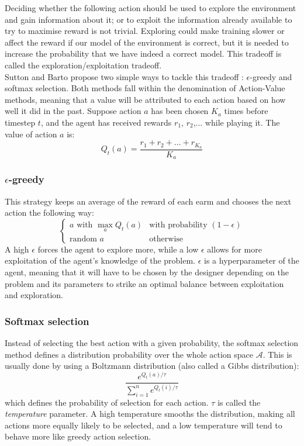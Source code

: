 Deciding whether the following action should be used to explore the environment
and gain information about it; or to exploit the information already available
to try to maximise reward is not trivial. Exploring could make training slower
or affect the reward if our model of the environment is correct, but it is 
needed to increase the probability that we have indeed a correct model. This
tradeoff is called the exploration/exploitation tradeoff. 
\\

Sutton and Barto \cite{suttonbarto} propose two
simple ways to tackle this tradeoff : $\epsilon$-greedy and softmax selection.
Both methods fall within the denomination of Action-Value methods, meaning
that a value will be attributed to each action based on how well it did
in the past. Suppose action $a$ has been chosen $K_a$ times before timestep
$t$, and the agent has received rewards $r_1$, $r_2$,... while playing it. 
The value of action $a$ is:
\begin{equation}
Q_t(a) = \frac{r_1 + r_2 + ... + r_{K_a}}{K_a}
	\label{eq:action-value}
\end{equation}

\subsubsection{$\epsilon$-greedy}
This strategy keeps an average of the reward of each earm and chooses the next
action the following way:
\begin{equation}\begin{cases}
	\text{$a$ with $\max\limits_aQ_t(a)$} & \text{with probability } (1-\epsilon) 
	\\
	\text{random $a$} & \text{otherwise}
\end{cases}
\label{eq:egreedy}
\end{equation}
A high $\epsilon$ forces the agent to explore more, while a low $\epsilon$
allows for more exploitation of the agent's knowledge of the problem. 
$\epsilon$ is a hyperparameter of the agent, meaning that it will have to
be chosen by the designer depending on the problem and its parameters to 
strike an optimal balance between exploitation and exploration.

\subsubsection{Softmax selection}
Instead of selecting the best action with a given probability, the 
softmax selection method defines a distribution probability over the whole
action space $\mathcal{A}$. This is usually done by using a Boltzmann distribution
(also called a Gibbs distribution):
$$ \frac{e^{Q_t(a)/\tau}}{\sum_{i=1}^{n}e^{Q_t(i)/\tau}} $$
which defines the probability of selection for each action. $\tau$ is called
the \textit{temperature} parameter. A high temperature smooths the distribution,
making all actions more equally likely to be selected, and a low temperature
will tend to behave more like greedy action selection.

